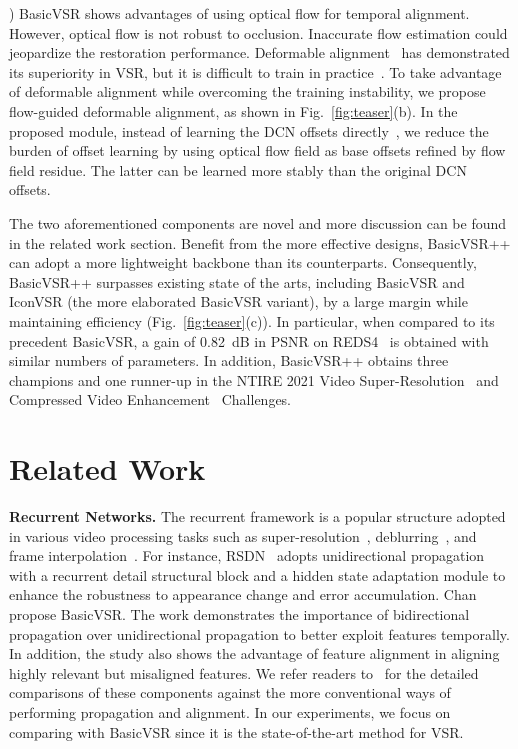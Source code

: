 \documentclass[10pt,twocolumn,letterpaper]{article}
\begin{document}
) BasicVSR shows advantages of using optical flow for temporal alignment. However, optical flow is not robust to occlusion. Inaccurate flow estimation could jeopardize the restoration performance. Deformable alignment~\cite{tian2020tdan,wang2019deformable,wang2019edvr} has demonstrated its superiority in VSR, but it is difficult to train in practice~\cite{chan2021understanding}. To take advantage of deformable alignment while overcoming the training instability, we propose flow-guided deformable alignment, as shown in Fig.~\ref{fig:teaser}(b). In the proposed module, instead of learning the DCN offsets directly~\cite{dai2017deformable,zhu2018deformable}, we reduce the burden of offset learning by using optical flow field as base offsets refined by flow field residue. The latter can be learned more stably than the original DCN offsets.

The two aforementioned components are novel and more discussion can be found in the related work section.
Benefit from the more effective designs, BasicVSR++ can adopt a more lightweight backbone than its counterparts. Consequently, BasicVSR++ surpasses existing state of the arts, including BasicVSR and IconVSR (the more elaborated BasicVSR variant), by a large margin while maintaining efficiency (Fig.~\ref{fig:teaser}(c)). In particular, when compared to its precedent BasicVSR, a gain of 0.82~dB in PSNR on REDS4~\cite{wang2019edvr} is obtained with similar numbers of parameters. In addition, BasicVSR++ obtains three champions and one runner-up in the NTIRE 2021 Video Super-Resolution~\cite{son2021ntire} and Compressed Video Enhancement~\cite{yang2021ntire} Challenges.
 \section{Related Work}
\noindent\textbf{Recurrent Networks.}
The recurrent framework is a popular structure adopted in various video processing tasks such as super-resolution~\cite{fuoli2019efficient,huang2015bidirectional,huang2018video,isobe2020video1,isobe2020revisiting,sajjadi2018frame}, deblurring~\cite{nah2019recurrent,zhou2019spatiotemporal}, and frame interpolation~\cite{xiang2020zooming}.
For instance, RSDN~\cite{isobe2020video1} adopts unidirectional propagation with a recurrent detail structural block and a hidden state adaptation module to enhance the robustness to appearance change and error accumulation.
Chan~\etal~\cite{chan2021basicvsr} propose BasicVSR. The work demonstrates the importance of bidirectional propagation over unidirectional propagation to better exploit features temporally. In addition, the study also shows the advantage of feature alignment in aligning highly relevant but misaligned features. We refer readers to~\cite{chan2021basicvsr} for the detailed comparisons of these components against the more conventional ways of performing propagation and alignment. In our experiments, we focus on comparing with BasicVSR since it is the state-of-the-art method for VSR.
\end{document}
